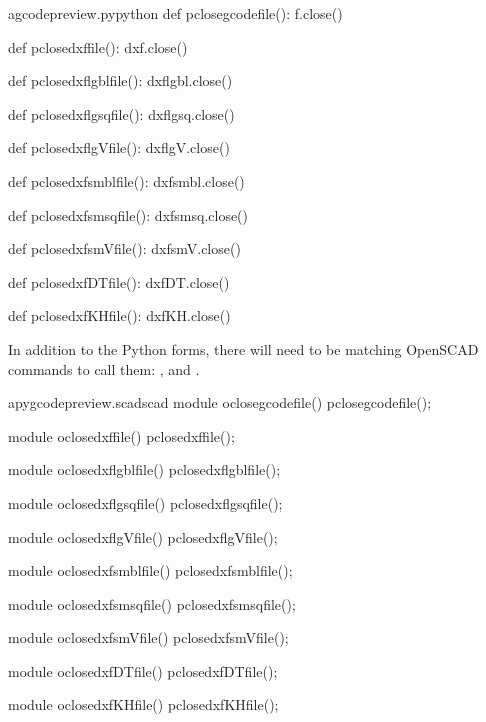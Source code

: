 \documentclass{ltxdoc}
\begin{document}
\lstset{firstnumber=\thegcpy}
\begin{writecode}{a}{gcodepreview.py}{python}
def pclosegcodefile():
    f.close()

def pclosedxffile():
    dxf.close()

def pclosedxflgblfile():
    dxflgbl.close()

def pclosedxflgsqfile():
    dxflgsq.close()

def pclosedxflgVfile():
    dxflgV.close()

def pclosedxfsmblfile():
    dxfsmbl.close()

def pclosedxfsmsqfile():
    dxfsmsq.close()

def pclosedxfsmVfile():
    dxfsmV.close()

def pclosedxfDTfile():
    dxfDT.close()

def pclosedxfKHfile():
    dxfKH.close()

\end{writecode}
\addtocounter{gcpy}{30}
%

In addition to the Python forms, there will need to be matching OpenSCAD commands to call them:
, and 
.

\lstset{firstnumber=\thepyscad}
\begin{writecode}{a}{pygcodepreview.scad}{scad}
module oclosegcodefile() {
    pclosegcodefile();
}

module oclosedxffile() {
    pclosedxffile();
}

module oclosedxflgblfile() {
    pclosedxflgblfile();
}

module oclosedxflgsqfile() {
    pclosedxflgsqfile();
}

module oclosedxflgVfile() {
    pclosedxflgVfile();
}

module oclosedxfsmblfile() {
    pclosedxfsmblfile();
}

module oclosedxfsmsqfile() {
    pclosedxfsmsqfile();
}

module oclosedxfsmVfile() {
    pclosedxfsmVfile();
}

module oclosedxfDTfile() {
    pclosedxfDTfile();
}

module oclosedxfKHfile() {
    pclosedxfKHfile();
}

\end{writecode}
\addtocounter{pyscad}{40}
%
\end{document}
